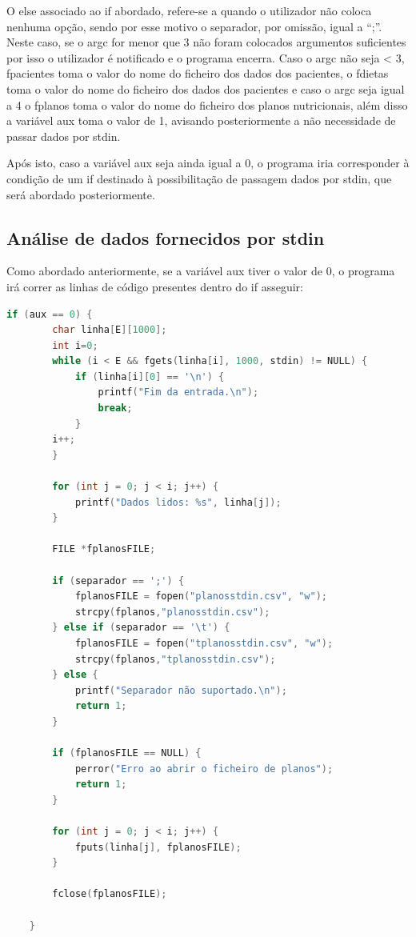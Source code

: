 \documentclass[a4wide]{report}
\begin{document}
O else associado ao if abordado, refere-se a quando o utilizador não coloca nenhuma opção, sendo por esse motivo o separador, por omissão, igual a “;”. Neste caso, se o argc for menor que 3 não foram colocados argumentos suficientes por isso o utilizador é notificado e o programa encerra. Caso o argc não seja < 3, fpacientes toma o valor do nome do ficheiro dos dados dos pacientes, o fdietas toma o valor do nome do ficheiro dos dados dos pacientes e caso o argc seja igual a 4 o fplanos toma o valor do nome do ficheiro dos planos nutricionais, além disso a variável aux toma o valor de 1, avisando posteriormente a não necessidade de passar dados por stdin. 

Após isto, caso a variável aux seja ainda igual a 0, o programa iria corresponder à condição de um if destinado à possibilitação de passagem dados por stdin, que será abordado posteriormente. 

\subsection{Análise de dados fornecidos por stdin}

\Large
Como abordado anteriormente, se a variável aux tiver o valor de 0, o programa irá correr as linhas de código presentes dentro do if asseguir: 

\begin{lstlisting}[language=C, caption={Código para análise de dados fornecidos por stdin}, label={lst:exemplo-c}]
    if (aux == 0) {
        char linha[E][1000];
        int i=0;
        while (i < E && fgets(linha[i], 1000, stdin) != NULL) {
            if (linha[i][0] == '\n') {
                printf("Fim da entrada.\n");
                break;
            }
        i++;
        }

        for (int j = 0; j < i; j++) {
            printf("Dados lidos: %s", linha[j]);
        }
        
        FILE *fplanosFILE;

        if (separador == ';') {
            fplanosFILE = fopen("planosstdin.csv", "w");
            strcpy(fplanos,"planosstdin.csv");
        } else if (separador == '\t') {
            fplanosFILE = fopen("tplanosstdin.csv", "w");
            strcpy(fplanos,"tplanosstdin.csv");
        } else {
            printf("Separador não suportado.\n");
            return 1;
        }

        if (fplanosFILE == NULL) {
            perror("Erro ao abrir o ficheiro de planos");
            return 1;
        }

        for (int j = 0; j < i; j++) {
            fputs(linha[j], fplanosFILE);
        }   

        fclose(fplanosFILE);

    }
\end{lstlisting}
\end{document}
